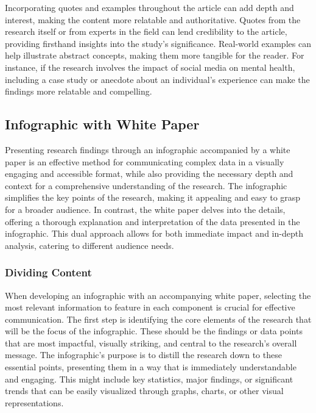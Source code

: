 \documentclass[
]{book}
\begin{document}
Incorporating quotes and examples throughout the article can add depth and interest, making the content more relatable and authoritative. Quotes from the research itself or from experts in the field can lend credibility to the article, providing firsthand insights into the study's significance. Real-world examples can help illustrate abstract concepts, making them more tangible for the reader. For instance, if the research involves the impact of social media on mental health, including a case study or anecdote about an individual's experience can make the findings more relatable and compelling.

\subsection{Infographic with White Paper}\label{infographic-with-white-paper}

Presenting research findings through an infographic accompanied by a white paper is an effective method for communicating complex data in a visually engaging and accessible format, while also providing the necessary depth and context for a comprehensive understanding of the research. The infographic simplifies the key points of the research, making it appealing and easy to grasp for a broader audience. In contrast, the white paper delves into the details, offering a thorough explanation and interpretation of the data presented in the infographic. This dual approach allows for both immediate impact and in-depth analysis, catering to different audience needs.

\subsubsection*{Dividing Content}\label{dividing-content}

When developing an infographic with an accompanying white paper, selecting the most relevant information to feature in each component is crucial for effective communication. The first step is identifying the core elements of the research that will be the focus of the infographic. These should be the findings or data points that are most impactful, visually striking, and central to the research's overall message. The infographic's purpose is to distill the research down to these essential points, presenting them in a way that is immediately understandable and engaging. This might include key statistics, major findings, or significant trends that can be easily visualized through graphs, charts, or other visual representations.
\end{document}
